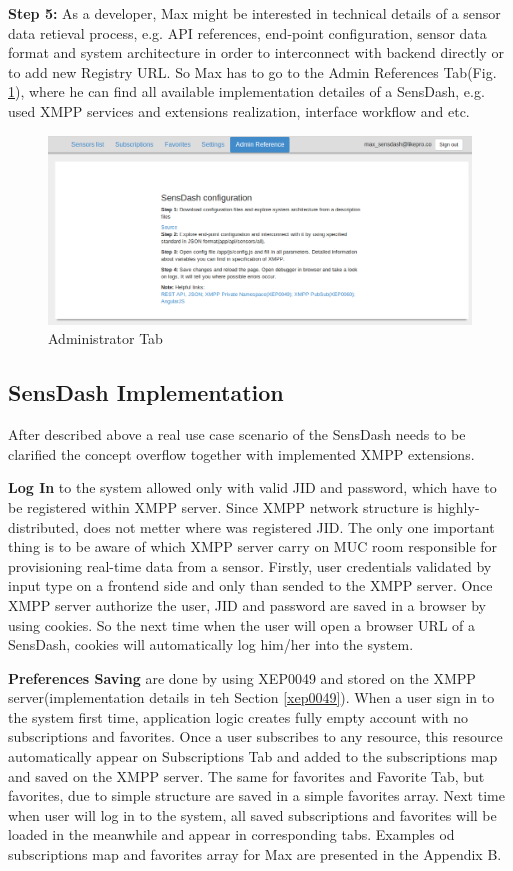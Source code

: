 \textbf{Step 5:} As a developer, Max might be interested in technical details of a sensor data retieval process, e.g. API references, end-point configuration, sensor data format and system architecture in order to interconnect with backend directly or to add new Registry URL. So Max has to go to the Admin References Tab(Fig. \ref{img:admin}), where he can find all available implementation detailes of a SensDash, e.g. used XMPP services and extensions realization, interface workflow and etc. 
\begin{figure}[!ht]
\centering
\includegraphics[scale=0.6]{Screenshots/UseCaseReferences.png}   
\caption[Administrator Tab]{Administrator Tab}
\label{img:admin}                         
\end{figure}

\subsection{SensDash Implementation}
After described above a real use case scenario of the SensDash needs to be clarified the concept overflow together with implemented XMPP extensions.

\textbf{Log In} to the system allowed only with valid JID and password, which have to be registered within XMPP server. Since XMPP network structure is highly-distributed, does not metter where was registered JID. The only one important thing is to be aware of which XMPP server carry on MUC room responsible for provisioning real-time data from a sensor. Firstly, user credentials validated by input type on a frontend side and only than sended to the XMPP server. Once XMPP server authorize the user, JID and password are saved in a browser by using cookies. So the next time when the user will open a browser URL of a SensDash, cookies will automatically log him/her into the system. 

\textbf{Preferences Saving} are done by using XEP0049 and stored on the XMPP server(implementation details in teh Section \ref{xep0049}). When a user sign in to the system first time, application logic creates fully empty account with no subscriptions and favorites. Once a user subscribes to any resource, this resource automatically appear on Subscriptions Tab and added to the subscriptions map and saved on the XMPP server. The same for favorites and Favorite Tab, but favorites, due to simple structure are saved in a simple favorites array. Next time when user will log in to the system, all saved subscriptions and favorites will be loaded in the meanwhile and appear in corresponding tabs. Examples od subscriptions map and favorites array for Max are presented in the Appendix B.

